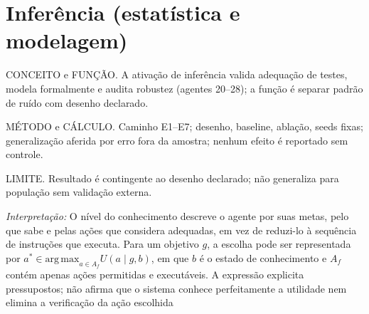 \section{Inferência (estatística e modelagem)}
\begin{descricao}
CONCEITO e FUNÇÃO. A ativação de inferência valida adequação de testes, modela
formalmente e audita robustez (agentes 20--28); a função é separar padrão de
ruído com desenho declarado.
\end{descricao}
\begin{metodo}
MÉTODO e CÁLCULO. Caminho E1--E7; desenho, baseline, ablação, seeds fixas;
generalização aferida por erro fora da amostra; nenhum efeito é reportado sem
controle.
\end{metodo}
\begin{aviso}
LIMITE. Resultado é contingente ao desenho declarado; não generaliza para
população sem validação externa.
\end{aviso}
\noindent\textit{Interpretação:} O nível do conhecimento descreve o agente por suas metas, pelo que sabe e pelas ações que considera adequadas, em vez de reduzi-lo à sequência de instruções que executa. Para um objetivo $g$, a escolha pode ser representada por $a^*\in\mathrm{arg\,max}_{a\in A_f}U(a\mid g,b)$, em que $b$ é o estado de conhecimento e $A_f$ contém apenas ações permitidas e executáveis. A expressão explicita pressupostos; não afirma que o sistema conhece perfeitamente a utilidade nem elimina a verificação da ação escolhida  %
